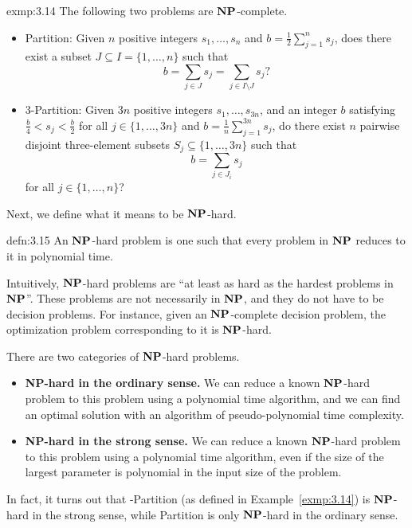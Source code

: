 \begin{exmp}{exmp:3.14}
    The following two problems are $\operatorname{\textbf{NP}}$-complete. 
    \begin{itemize}
        \item {\sc Partition}: Given $n$ positive integers $s_1, \dots, s_n$ 
        and $b = \frac12 \sum_{j=1}^n s_j$, does there exist a subset 
        $J \subseteq I = \{1, \dots, n\}$ such that 
        \[ b = \sum_{j\in J} s_j = \sum_{j\in I\setminus J} s_j? \] 
        \item {\sc $3$-Partition}: Given $3n$ positive integers 
        $s_1, \dots, s_{3n}$, and an integer $b$ satisfying 
        $\frac{b}{4} < s_j < \frac{b}{2}$ for all $j \in \{1, \dots, 3n\}$ 
        and $b = \frac1n \sum_{j=1}^{3n} s_j$, do there exist 
        $n$ pairwise disjoint three-element subsets $S_j \subseteq 
        \{1, \dots, 3n\}$ such that 
        \[ b = \sum_{j\in J_i} s_j \] 
        for all $j \in \{1, \dots, n\}$? 
    \end{itemize}
\end{exmp}

Next, we define what it means to be $\operatorname{\textbf{NP}}$-hard. 

\begin{defn}{defn:3.15}
    An $\operatorname{\textbf{NP}}$-hard problem is one such that every problem in $\operatorname{\textbf{NP}}$ 
    reduces to it in polynomial time. 
\end{defn}

Intuitively, $\operatorname{\textbf{NP}}$-hard problems are ``at least as hard as the hardest 
problems in $\operatorname{\textbf{NP}}$''. These problems are not necessarily in $\operatorname{\textbf{NP}}$, and they 
do not have to be decision problems. 
For instance, given an $\operatorname{\textbf{NP}}$-complete decision problem, the optimization 
problem corresponding to it is $\operatorname{\textbf{NP}}$-hard. 

There are two categories of $\operatorname{\textbf{NP}}$-hard problems.  
\begin{itemize}
    \item {\bf NP-hard in the ordinary sense.} We can reduce a known 
    $\operatorname{\textbf{NP}}$-hard problem to this problem using a polynomial time algorithm, 
    and we can find an optimal solution with an algorithm of pseudo-polynomial 
    time complexity. 
    \item {\bf NP-hard in the strong sense.} We can reduce a known 
    $\operatorname{\textbf{NP}}$-hard problem to this problem using a polynomial time algorithm, 
    even if the size of the largest parameter is polynomial in the 
    input size of the problem. 
\end{itemize}

In fact, it turns out that {-Partition} (as defined in Example~\ref{exmp:3.14})
is $\operatorname{\textbf{NP}}$-hard in the strong sense, while {\sc Partition} is only $\operatorname{\textbf{NP}}$-hard 
in the ordinary sense. 


